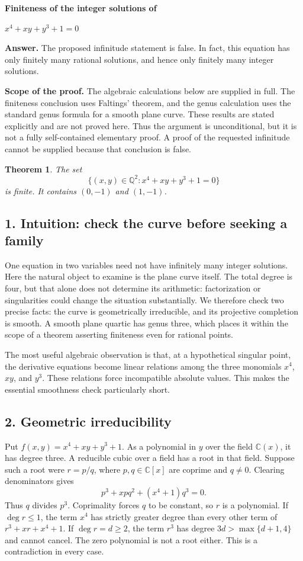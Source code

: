 \documentclass[11pt,a4paper]{article}
\newtheorem{theorem}{Theorem}
\newcommand{\C}{\mathbb C}
\newcommand{\Q}{\mathbb Q}
\begin{document}
\begin{center}
  {\Large\bfseries Finiteness of the integer solutions of}\par\vspace{5pt}
  {\Large $x^4+xy+y^3+1=0$}
\end{center}

\textbf{Answer.} The proposed infinitude statement is false. In fact, this
equation has only finitely many rational solutions, and hence only finitely
many integer solutions.

\textbf{Scope of the proof.} The algebraic
calculations below are supplied in full. The finiteness conclusion uses
Faltings' theorem, and the genus calculation uses the standard genus formula
for a smooth plane curve. These results are stated explicitly and are not
proved here. Thus the argument is unconditional, but it is not a fully
self-contained elementary proof. A proof of the requested infinitude cannot
be supplied because that conclusion is false.

\begin{theorem}
The set
\[
  \{(x,y)\in\Q^2:x^4+xy+y^3+1=0\}
\]
is finite. It contains $(0,-1)$ and $(1,-1)$.
\end{theorem}

\subsection*{1. Intuition: check the curve before seeking a family}
One equation in two variables need not have infinitely many integer
solutions. Here the natural object to examine is the plane curve itself.
The total degree is four, but that alone does not determine its arithmetic:
factorization or singularities could change the situation substantially.
We therefore check two precise facts: the curve is geometrically
irreducible, and its projective completion is smooth. A smooth plane quartic
has genus three, which places it within the scope of a theorem asserting
finiteness even for rational points.

The most useful algebraic observation is that, at a hypothetical singular
point, the derivative equations become linear relations among the three
monomials $x^4$, $xy$, and $y^3$. These relations force incompatible absolute
values. This makes the essential smoothness check particularly short.

\subsection*{2. Geometric irreducibility}
Put $f(x,y)=x^4+xy+y^3+1$. As a polynomial in $y$ over the field $\C(x)$,
it has degree three. A reducible cubic over a field has a root in that field.
Suppose such a root were $r=p/q$, where $p,q\in\C[x]$ are coprime and
$q\ne0$. Clearing denominators gives
\[
  p^3+xpq^2+(x^4+1)q^3=0.
\]
Thus $q$ divides $p^3$. Coprimality forces $q$ to be constant, so $r$ is a
polynomial. If $\deg r\le1$, the term $x^4$ has strictly greater degree
than every other term of $r^3+xr+x^4+1$. If $\deg r=d\ge2$, the term
$r^3$ has degree $3d>\max\{d+1,4\}$ and cannot cancel. The zero polynomial
is not a root either. This is a contradiction in every case.
\end{document}
